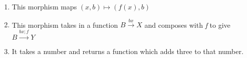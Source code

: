 \begin{enumerate}
    \item This morphism maps $(x,b)\mapsto (f(x),b)$
    \item This morphism takes in a function $B \xrightarrow{bx} X$ and composes with \emph{f} to give $B \xrightarrow{bx;f} Y$
    \item It takes a number and returns a function which adds three to that number.
  \end{enumerate}

